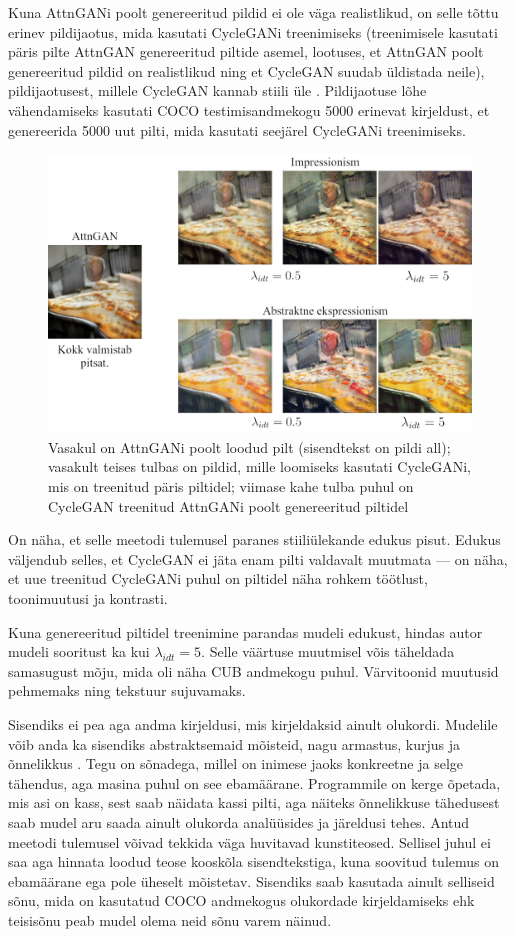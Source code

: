 \documentclass{vilgym}
\begin{document}
	Kuna AttnGANi poolt genereeritud pildid ei ole väga realistlikud, on selle tõttu erinev pildijaotus, mida kasutati \mbox{CycleGANi} treenimiseks (treenimisele kasutati päris pilte AttnGAN genereeritud piltide asemel, lootuses, et AttnGAN poolt genereeritud pildid on realistlikud ning et CycleGAN suudab üldistada neile), pildijaotusest, millele CycleGAN kannab stiili üle . Pildijaotuse lõhe vähendamiseks kasutati COCO testimisandmekogu 5000 erinevat kirjeldust, et genereerida 5000 uut pilti, mida kasutati seejärel CycleGANi treenimiseks.

	\begin{figure}[t]
		\includegraphics[width=0.8\linewidth]{images/coco.png}
		\caption{Vasakul on AttnGANi poolt loodud pilt (sisendtekst on pildi all); vasakult teises tulbas on pildid, mille loomiseks kasutati CycleGANi, mis on treenitud päris piltidel; viimase kahe tulba puhul on CycleGAN treenitud AttnGANi poolt genereeritud piltidel}
		\label{fig:coco}
	\end{figure}

	On näha, et selle meetodi tulemusel paranes stiiliülekande edukus pisut. Edukus väljendub selles, et CycleGAN ei jäta enam pilti valdavalt muutmata --- on näha, et uue treenitud CycleGANi puhul on piltidel näha rohkem töötlust, toonimuutusi ja kontrasti.

	Kuna genereeritud piltidel treenimine parandas mudeli edukust, hindas autor mudeli sooritust ka kui $ \lambda_{idt} = 5 $. Selle väärtuse muutmisel võis täheldada samasugust mõju, mida oli näha CUB andmekogu puhul. Värvitoonid muutusid pehmemaks ning tekstuur sujuvamaks. 

	Sisendiks ei pea aga andma kirjeldusi, mis kirjeldaksid ainult olukordi. Mudelile võib anda ka sisendiks abstraktsemaid mõisteid, nagu armastus, kurjus ja õnnelikkus . Tegu on sõnadega, millel on inimese jaoks konkreetne ja selge tähendus, aga masina puhul on see ebamäärane. Programmile on kerge õpetada, mis asi on kass, sest saab näidata kassi pilti, aga näiteks õnnelikkuse tähedusest saab mudel aru saada ainult olukorda analüüsides ja järeldusi tehes. Antud meetodi tulemusel võivad tekkida väga huvitavad kunstiteosed. Sellisel juhul ei saa aga hinnata loodud teose kooskõla sisendtekstiga, kuna soovitud tulemus on ebamäärane ega pole üheselt mõistetav. Sisendiks saab kasutada ainult selliseid sõnu, mida on kasutatud COCO andmekogus olukordade kirjeldamiseks ehk teisisõnu peab mudel olema neid sõnu varem näinud.
\end{document}
